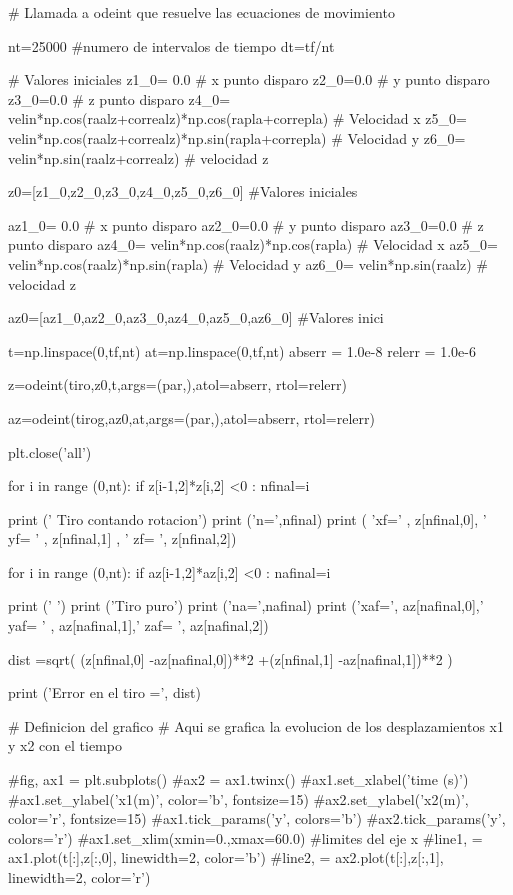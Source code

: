 \documentclass{article}
\begin{document}
\begin{python}
# Llamada a odeint que resuelve las ecuaciones de movimiento

nt=25000  #numero de intervalos de tiempo
dt=tf/nt

# Valores iniciales
z1_0= 0.0  # x punto disparo
z2_0=0.0  # y punto disparo
z3_0=0.0  # z punto disparo
z4_0= velin*np.cos(raalz+correalz)*np.cos(rapla+correpla)  # Velocidad x 
z5_0= velin*np.cos(raalz+correalz)*np.sin(rapla+correpla)  # Velocidad y
z6_0= velin*np.sin(raalz+correalz)   # velocidad z

z0=[z1_0,z2_0,z3_0,z4_0,z5_0,z6_0] #Valores iniciales   

az1_0= 0.0  # x punto disparo
az2_0=0.0  # y punto disparo
az3_0=0.0  # z punto disparo
az4_0= velin*np.cos(raalz)*np.cos(rapla)  # Velocidad x 
az5_0= velin*np.cos(raalz)*np.sin(rapla)  # Velocidad y
az6_0= velin*np.sin(raalz)   # velocidad z

az0=[az1_0,az2_0,az3_0,az4_0,az5_0,az6_0] #Valores inici
 
t=np.linspace(0,tf,nt)
at=np.linspace(0,tf,nt)
abserr = 1.0e-8
relerr = 1.0e-6

z=odeint(tiro,z0,t,args=(par,),atol=abserr, rtol=relerr)

az=odeint(tirog,az0,at,args=(par,),atol=abserr, rtol=relerr)


plt.close('all')



for i in range (0,nt): 
    if z[i-1,2]*z[i,2] <0 : nfinal=i

print (' Tiro  contando rotacion')
print ('n=',nfinal)
print ( 'xf=' , z[nfinal,0], '  yf= ' , z[nfinal,1] , '  zf= ', z[nfinal,2])

for i in range (0,nt): 
    if az[i-1,2]*az[i,2] <0 : nafinal=i

print ('   ')
print ('Tiro puro')
print ('na=',nafinal)
print ('xaf=', az[nafinal,0],'  yaf= ' , az[nafinal,1],' zaf= ', az[nafinal,2])


dist =sqrt(  (z[nfinal,0] -az[nafinal,0])**2  +(z[nfinal,1] -az[nafinal,1])**2  )

print ('Error en el tiro =', dist)


# Definicion del grafico
# Aqui se grafica la evolucion de los desplazamientos x1 y x2 con el tiempo

#fig, ax1 = plt.subplots()
#ax2 = ax1.twinx()
#ax1.set_xlabel('time (s)')
#ax1.set_ylabel('x1(m)', color='b', fontsize=15)
#ax2.set_ylabel('x2(m)', color='r', fontsize=15)
#ax1.tick_params('y', colors='b')
#ax2.tick_params('y', colors='r')
#ax1.set_xlim(xmin=0.,xmax=60.0) #limites del eje x
#line1, = ax1.plot(t[:],z[:,0], linewidth=2, color='b')
#line2, = ax2.plot(t[:],z[:,1], linewidth=2, color='r')


\end{python}
\end{document}
